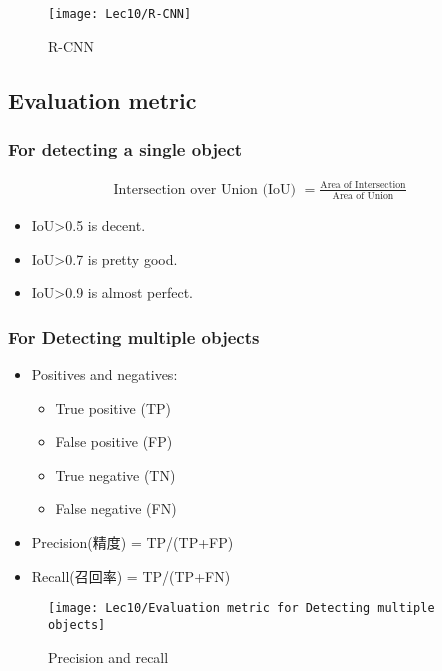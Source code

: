 \begin{figure}[H]
    \centering
    \texttt{[image: Lec10/R-CNN]}
    \caption{R-CNN}
\end{figure}

\subsection{Evaluation metric}

\subsubsection{For detecting a single object}
\begin{align*}
    \text{Intersection over Union (IoU) }= \frac{\text{Area of Intersection}}{\text{Area of Union}}
\end{align*}

\begin{itemize}
    \item IoU>0.5 is decent. 
    \item IoU>0.7 is pretty good. 
    \item IoU>0.9 is almost perfect. 
\end{itemize}

\subsubsection{For Detecting multiple objects}

\begin{itemize}
    \item Positives and negatives:
    \begin{itemize}
        \item True positive (TP)
        \item False positive (FP)
        \item True negative (TN)
        \item False negative (FN)
    \end{itemize}
    \item Precision(精度) = TP/(TP+FP) 
    \item Recall(召回率) = TP/(TP+FN)
\end{itemize}

\begin{figure}[H]
    \centering
    \texttt{[image: Lec10/Evaluation metric for Detecting multiple objects]}
    \caption{Precision and recall}
\end{figure}

